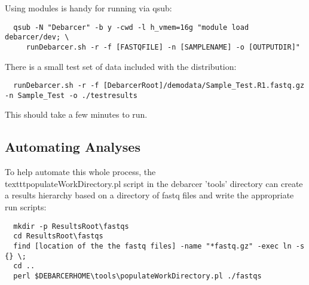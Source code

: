 \documentclass{article}
\begin{document}
Using modules is handy for running via qsub:

\begin{verbatim}
  qsub -N "Debarcer" -b y -cwd -l h_vmem=16g "module load debarcer/dev; \ 
	 runDebarcer.sh -r -f [FASTQFILE] -n [SAMPLENAME] -o [OUTPUTDIR]"
\end{verbatim}

There is a small test set of data included with the distribution:

\begin{verbatim}
  runDebarcer.sh -r -f [DebarcerRoot]/demodata/Sample_Test.R1.fastq.gz -n Sample_Test -o ./testresults
\end{verbatim}

This should take a few minutes to run.

\subsection{Automating Analyses}

To help automate this whole process, the \\texttt{populateWorkDirectory.pl} script in the 
debarcer 'tools' directory can create a results hierarchy based on a
directory of fastq files and write the appropriate run scripts:

\begin{verbatim}
  mkdir -p ResultsRoot\fastqs
  cd ResultsRoot\fastqs
  find [location of the the fastq files] -name "*fastq.gz" -exec ln -s {} \;
  cd ..
  perl $DEBARCERHOME\tools\populateWorkDirectory.pl ./fastqs
\end{verbatim}
\end{document}
